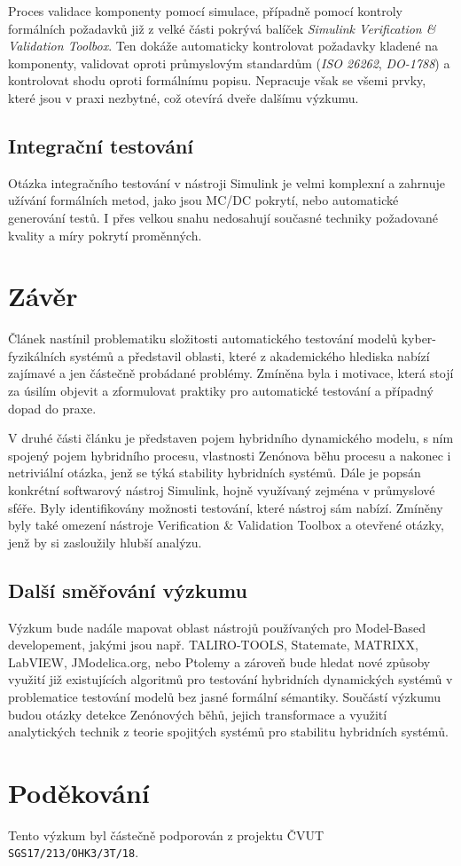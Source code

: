 \documentclass[conference,a4paper]{IEEEtran-CZ}
\begin{document}
Proces validace komponenty pomocí simulace, případně pomocí kontroly formálních požadavků
již z velké části pokrývá balíček \emph{Simulink Verification \& Validation Toolbox}. Ten dokáže automaticky 
kontrolovat požadavky kladené na komponenty, validovat oproti průmyslovým standardům 
(\emph{ISO 26262}, \emph{DO-1788}) a kontrolovat shodu oproti formálnímu popisu. Nepracuje
však se všemi prvky, které jsou v praxi nezbytné, což otevírá dveře dalšímu výzkumu.

\subsection{Integrační testování}

Otázka integračního testování v nástroji Simulink je velmi komplexní a zahrnuje užívání formálních metod, jako jsou
MC/DC pokrytí, nebo automatické generování testů. I přes velkou snahu nedosahují současné
techniky požadované kvality a míry pokrytí proměnných.

\section{Závěr}

Článek nastínil problematiku složitosti automatického testování modelů kyber-fyzikálních systémů
a představil oblasti, které z akademického hlediska nabízí zajímavé a jen částečně 
probádané problémy.  Zmíněna byla i motivace, která stojí za úsilím 
objevit a zformulovat praktiky pro automatické testování a případný dopad do praxe.

V druhé části článku je představen pojem hybridního dynamického modelu, s ním spojený
pojem hybridního procesu, vlastnosti Zenónova běhu procesu a nakonec i netriviální otázka, 
jenž se týká stability hybridních systémů. Dále je popsán konkrétní softwarový nástroj Simulink,
hojně využívaný zejména v průmyslové sféře. Byly identifikovány možnosti testování,
které nástroj sám nabízí. Zmíněny byly také omezení nástroje Verification \& Validation Toolbox 
a otevřené otázky, jenž by si zasloužily hlubší analýzu.

\subsection{Další směřování výzkumu}

Výzkum bude nadále mapovat oblast nástrojů používaných pro Model-Based developement, 
jakými jsou např. TALIRO-TOOLS, Statemate, MATRIXX, LabVIEW, JModelica.org, 
nebo Ptolemy a zároveň bude hledat nové způsoby využití již existujících algoritmů 
pro testování hybridních dynamických systémů v problematice testování modelů bez jasné formální
sémantiky. Součástí výzkumu budou otázky detekce Zenónových běhů, jejich transformace
a využití analytických technik z teorie spojitých systémů pro stabilitu hybridních systémů.

\section*{Poděkování}

Tento výzkum byl částečně podporován z projektu ČVUT
\texttt{SGS17/213/OHK3/3T/18}.


\def\refname{Literatura}


\vspace{0cm}
\end{document}
